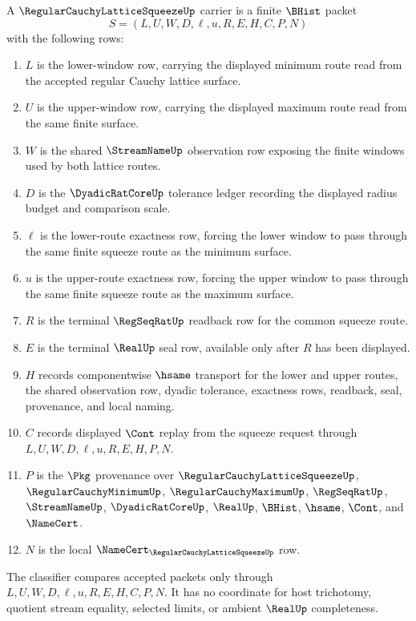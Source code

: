 \begin{definition}
\label{def:regular-cauchy-lattice-squeeze-carrier}
A $\RegularCauchyLatticeSqueezeUp$ carrier is a finite $\BHist$ packet
$$
S=(L,U,W,D,\ell,u,R,E,H,C,P,N)
$$
with the following rows:
\begin{enumerate}
\item $L$ is the lower-window row, carrying the displayed minimum route read from the accepted regular Cauchy lattice surface.
\item $U$ is the upper-window row, carrying the displayed maximum route read from the same finite surface.
\item $W$ is the shared $\StreamNameUp$ observation row exposing the finite windows used by both lattice routes.
\item $D$ is the $\DyadicRatCoreUp$ tolerance ledger recording the displayed radius budget and comparison scale.
\item $\ell$ is the lower-route exactness row, forcing the lower window to pass through the same finite squeeze route as the minimum surface.
\item $u$ is the upper-route exactness row, forcing the upper window to pass through the same finite squeeze route as the maximum surface.
\item $R$ is the terminal $\RegSeqRatUp$ readback row for the common squeeze route.
\item $E$ is the terminal $\RealUp$ seal row, available only after $R$ has been displayed.
\item $H$ records componentwise $\hsame$ transport for the lower and upper routes, the shared observation row, dyadic tolerance, exactness rows, readback, seal, provenance, and local naming.
\item $C$ records displayed $\Cont$ replay from the squeeze request through $L,U,W,D,\ell,u,R,E,H,P,N$.
\item $P$ is the $\Pkg$ provenance over $\RegularCauchyLatticeSqueezeUp$, $\RegularCauchyMinimumUp$, $\RegularCauchyMaximumUp$, $\RegSeqRatUp$, $\StreamNameUp$, $\DyadicRatCoreUp$, $\RealUp$, $\BHist$, $\hsame$, $\Cont$, and $\NameCert$.
\item $N$ is the local $\NameCert_{\RegularCauchyLatticeSqueezeUp}$ row.
\end{enumerate}
The classifier compares accepted packets only through $L,U,W,D,\ell,u,R,E,H,C,P,N$. It has no coordinate for host trichotomy, quotient stream equality, selected limits, or ambient $\RealUp$ completeness.
\end{definition}

